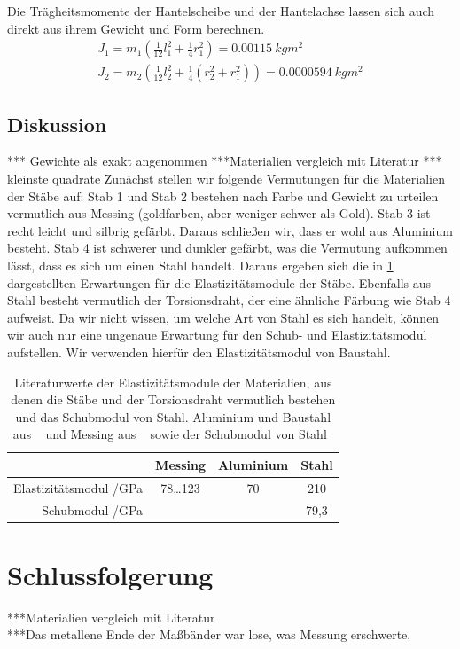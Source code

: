 \documentclass[
	a4paper,
	12pt,
	pagesize,
	ngerman
]{scrartcl}
\begin{document}
	Die Trägheitsmomente der Hantelscheibe und der Hantelachse lassen sich auch direkt aus ihrem Gewicht und Form berechnen.
	\begin{align}
		J_1 = m_1(\frac{1}{12}l_1^2+\frac{1}{4}r_1^2) = \SI{0,00115}{kgm^2}\\
		J_2 = m_2(\frac{1}{12}l_2^2+\frac{1}{4}(r_2^2 + r_1^2))= \SI{0,0000594}{kgm^2}
	\end{align}
	
	\subsection{Diskussion}
	*** Gewichte als exakt angenommen
	***Materialien vergleich mit Literatur
	*** kleinste quadrate
	Zunächst stellen wir folgende Vermutungen für die Materialien der Stäbe auf: Stab 1 und Stab 2 bestehen nach Farbe und Gewicht zu urteilen vermutlich aus Messing (goldfarben, aber weniger schwer als Gold). Stab 3 ist recht leicht und silbrig gefärbt. Daraus schließen wir, dass er wohl aus Aluminium besteht. Stab 4 ist schwerer und dunkler gefärbt, was die Vermutung aufkommen lässt, dass es sich um einen Stahl handelt. Daraus ergeben sich die in \cref{Tabelle_Elastizitätsmodule_Literatur} dargestellten Erwartungen für die Elastizitätsmodule der Stäbe. Ebenfalls aus Stahl besteht vermutlich der Torsionsdraht, der eine ähnliche Färbung wie Stab 4 aufweist. Da wir nicht wissen, um welche Art von Stahl es sich handelt, können wir auch nur eine ungenaue Erwartung für den Schub- und Elastizitätsmodul aufstellen. Wir verwenden hierfür den Elastizitätsmodul von Baustahl. 
	
	\begin{table}[tb]
		\centering
		\begin{tabular}{ r | c | c | c |}
			&  Messing & Aluminium& Stahl\\ \hline
			Elastizitätsmodul /\si{\giga \pascal} & 78…123 & 70 & 210\\
			Schubmodul /\si{\giga \pascal} & & & 79,3 \\
			\hline
		\end{tabular}
		\caption{Literaturwerte der Elastizitätsmodule der Materialien, aus denen die Stäbe und der Torsionsdraht vermutlich bestehen und das Schubmodul von Stahl. Aluminium und Baustahl aus ~\cite[S. 624 f.]{Taschenbuch} und Messing aus ~\cite[S. E 66.]{Huette} sowie der Schubmodul von Stahl~\cite{Solids}} %
		\label{Tabelle_Elastizitätsmodule_Literatur} 
	\end{table}

	\section{Schlussfolgerung}
	***Materialien vergleich mit Literatur \\
	***Das metallene Ende der Maßbänder war lose, was Messung erschwerte.
	
	\printbibliography
\end{document}
